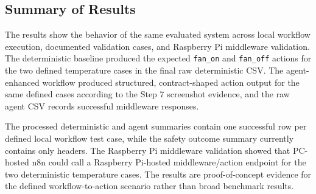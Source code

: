 \subsection{Summary of Results}\label{subsec:results-summary}

The results show the behavior of the same evaluated system across local workflow execution, documented validation cases, and Raspberry Pi middleware validation. The deterministic baseline produced the expected \texttt{fan\_on} and \texttt{fan\_off} actions for the two defined temperature cases in the final raw deterministic CSV. The agent-enhanced workflow produced structured, contract-shaped action output for the same defined cases according to the Step 7 screenshot evidence, and the raw agent CSV records successful middleware responses.

The processed deterministic and agent summaries contain one successful row per defined local workflow test case, while the safety outcome summary currently contains only headers. The Raspberry Pi middleware validation showed that PC-hosted n8n could call a Raspberry Pi-hosted middleware/action endpoint for the two deterministic temperature cases. The results are proof-of-concept evidence for the defined workflow-to-action scenario rather than broad benchmark results.
